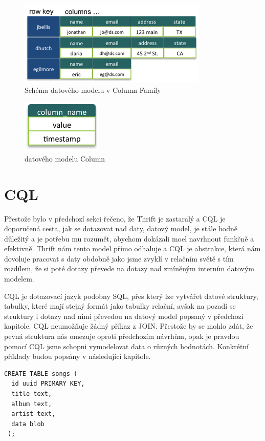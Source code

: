 \begin{figure}[!h]
\centering
\includegraphics[scale=0.95]{images/static_column_family}
\caption{Schéma datového modelu v Column Family}
\label{fig:vnodes}
\end{figure}

\begin{figure}[!h]
\centering
\includegraphics[scale=1.5]{images/column}
\caption{datového modelu Column}
\label{fig:vnodes}
\end{figure}

\section{CQL}
Přestože bylo v předchozí sekci řečeno, že Thrift je zastaralý a CQL je doporučená cesta, jak se dotazovat nad daty, datový model, je stále hodně důležitý a je potřebu mu rozumět, abychom dokázali moel navrhnout funkčně a efektivně. Thrift nám tento model přímo odhaluje a CQL je abstrakce, která nám dovoluje pracovat s daty obdobně jako jsme zvyklí v relačním světě s tím rozdílem, že si poté dotazy převede na dotazy nad zmíněným interním datovým modelem. 

CQL je dotazovací jazyk podobny SQL, přes který lze vytvářet datové struktury, tabulky, které mají stejný formát jako tabulky relační, avšak na pozadí se struktury i dotazy nad nimi převedou na datový model popsaný v předchozí kapitole. CQL neumožňuje žádný příkaz z  JOIN. Přestože by se mohlo zdát, že pevná struktura nás omezuje oproti předchozím návrhům, opak je pravdou pomocí CQL jsme schopni vymodelovat data o různých hodnotách. Konkrétní příklady budou popsány v následující kapitole. 

\newpage

\begin{lstlisting}[caption={Tvorba jednoduché tabulky pomocí CQL},label=CQL1]
CREATE TABLE songs (
  id uuid PRIMARY KEY,
  title text,
  album text,
  artist text,
  data blob
 );
\end{lstlisting}

